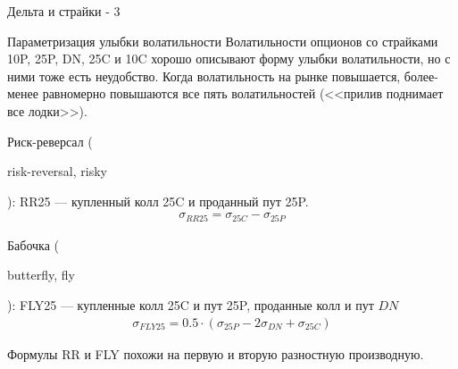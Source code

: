 \documentclass{beamer}
\newcommand{\en}[1]{\begin{otherlanguage}{english}#1\end{otherlanguage}}
\begin{document}
\begin{frame}{Дельта и страйки - 3}
\centering
{}
\end{frame}



\begin{frame}{Параметризация улыбки волатильности}
\justify
Волатильности опционов со страйками 10P, 25P, DN, 25C и 10C хорошо описывают форму улыбки волатильности, но с ними тоже есть неудобство. Когда волатильность на рынке повышается, более-менее равномерно повышаются все пять волатильностей (<<прилив поднимает все лодки>>).

\justify
\alert{Риск-реверсал} (\en{risk-reversal, risky}): RR25 --- купленный колл 25C и проданный пут 25P.
\begin{align*}
\sigma_{RR25} = \sigma_{25C} - \sigma_{25P}
\end{align*}

\justify
\alert{Бабочка} (\en{butterfly, fly}): FLY25 --- купленные колл 25C и пут 25P, проданные колл и пут $DN$
\begin{align*}
\sigma_{FLY25} = 0.5\cdot(\sigma_{25P} - 2\sigma_{DN} + \sigma_{25C})
\end{align*}

\justify
Формулы RR и FLY похожи на первую и вторую разностную производную.
\end{frame}
\end{document}
